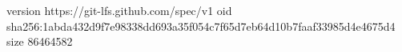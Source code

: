 version https://git-lfs.github.com/spec/v1
oid sha256:1abda432d9f7e98338dd693a35f054c7f65d7eb64d10b7faaf33985d4e4675d4
size 86464582
